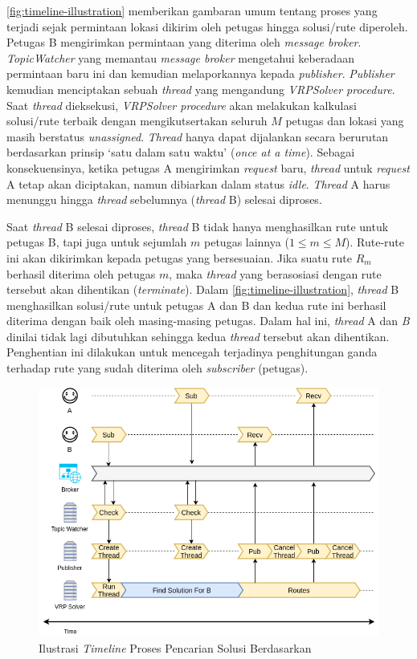 \autoref{fig:timeline-illustration} memberikan gambaran umum tentang proses yang terjadi sejak permintaan lokasi dikirim oleh petugas hingga solusi/rute diperoleh. Petugas B mengirimkan permintaan yang diterima oleh \textit{message broker}. \textit{TopicWatcher} yang memantau \textit{message broker} mengetahui keberadaan permintaan baru ini dan kemudian melaporkannya kepada \textit{publisher}. \textit{Publisher} kemudian menciptakan sebuah \textit{thread} yang mengandung \textit{VRPSolver procedure}. Saat \textit{thread} dieksekusi, \textit{VRPSolver procedure} akan melakukan kalkulasi solusi/rute terbaik dengan mengikutsertakan seluruh $M$ petugas dan lokasi yang masih berstatus \textit{unassigned}. \textit{Thread} hanya dapat dijalankan secara berurutan berdasarkan prinsip `satu dalam satu waktu' (\textit{once at a time}). Sebagai konsekuensinya, ketika petugas A mengirimkan \textit{request} baru, \textit{thread} untuk \textit{request} A tetap akan diciptakan, namun dibiarkan dalam status \textit{idle}. \textit{Thread} A harus menunggu hingga \textit{thread} sebelumnya (\textit{thread} B) selesai diproses. 

Saat \textit{thread} B selesai diproses, \textit{thread} B tidak hanya menghasilkan rute untuk petugas B, tapi juga untuk sejumlah $m$ petugas lainnya ($1 \leq m \leq M$). Rute-rute ini akan dikirimkan kepada petugas yang bersesuaian. Jika suatu rute $R_m$ berhasil diterima oleh petugas $m$, maka \textit{thread} yang berasosiasi dengan rute tersebut akan dihentikan (\textit{terminate}). Dalam \autoref{fig:timeline-illustration}, \textit{thread} B menghasilkan solusi/rute untuk petugas A dan B dan kedua rute ini berhasil diterima dengan baik oleh masing-masing petugas. Dalam hal ini, \textit{thread} A dan \textit{B} dinilai tidak lagi dibutuhkan sehingga kedua \textit{thread} tersebut akan dihentikan. Penghentian ini dilakukan untuk mencegah terjadinya penghitungan ganda terhadap rute yang sudah diterima oleh \textit{subscriber} (petugas). 


\begin{figure}[!]
	\centering
	\includegraphics[width=\textwidth]{Resources/Images/timeline-illustration}
	\caption{Ilustrasi \textit{Timeline} Proses Pencarian Solusi Berdasarkan}
	\label{fig:timeline-illustration}
\end{figure}


